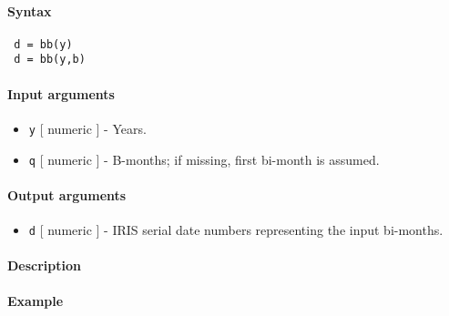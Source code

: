 


	\paragraph{Syntax}
 
 \begin{verbatim}
 d = bb(y)
 d = bb(y,b)
 \end{verbatim}
 
 \paragraph{Input arguments}
 
 \begin{itemize}
 \item
   \texttt{y} {[} numeric {]} - Years.
 \item
   \texttt{q} {[} numeric {]} - B-months; if missing, first bi-month is
   assumed.
 \end{itemize}
 
 \paragraph{Output arguments}
 
 \begin{itemize}
 \item
   \texttt{d} {[} numeric {]} - IRIS serial date numbers representing the
   input bi-months.
 \end{itemize}
 
 \paragraph{Description}
 
 \paragraph{Example}



